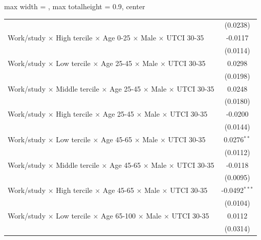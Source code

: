 \begin{table}[htbp]
\begin{adjustbox}{max width = \textwidth, max totalheight = 0.9\textheight, center}
\begin{tabular}{lc}
                                                                                                        & (0.0238)\\   
         Work/study $\times$ High tercile $\times$ Age 0-25 $\times$ Male $\times$ UTCI 30-35           & -0.0117\\   
                                                                                                        & (0.0114)\\   
         Work/study $\times$ Low tercile $\times$ Age 25-45 $\times$ Male $\times$ UTCI 30-35           & 0.0298\\   
                                                                                                        & (0.0198)\\   
         Work/study $\times$ Middle tercile $\times$ Age 25-45 $\times$ Male $\times$ UTCI 30-35        & 0.0248\\   
                                                                                                        & (0.0180)\\   
         Work/study $\times$ High tercile $\times$ Age 25-45 $\times$ Male $\times$ UTCI 30-35          & -0.0200\\   
                                                                                                        & (0.0144)\\   
         Work/study $\times$ Low tercile $\times$ Age 45-65 $\times$ Male $\times$ UTCI 30-35           & 0.0276$^{**}$\\   
                                                                                                        & (0.0112)\\   
         Work/study $\times$ Middle tercile $\times$ Age 45-65 $\times$ Male $\times$ UTCI 30-35        & -0.0118\\   
                                                                                                        & (0.0095)\\   
         Work/study $\times$ High tercile $\times$ Age 45-65 $\times$ Male $\times$ UTCI 30-35          & -0.0492$^{***}$\\   
                                                                                                        & (0.0104)\\   
         Work/study $\times$ Low tercile $\times$ Age 65-100 $\times$ Male $\times$ UTCI 30-35          & 0.0112\\   
                                                                                                        & (0.0314)\\   

\end{tabular}
\end{adjustbox}
\end{table}

